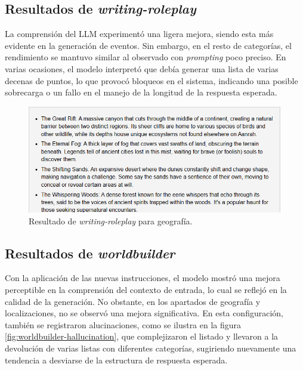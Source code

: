 \subsection{Resultados de \textit{writing-roleplay}}
La comprensión del LLM experimentó una ligera mejora,
siendo esta más evidente en la generación de eventos.
Sin embargo, en el resto de categorías, el rendimiento se mantuvo similar al observado con \textit{prompting} poco preciso.
En varias ocasiones, el modelo interpretó que debía generar una lista de varias decenas de puntos,
lo que provocó bloqueos en el sistema, indicando una posible sobrecarga o un fallo en el manejo de la longitud de la respuesta esperada.

\begin{figure}[htbp]
	\centering
	\includegraphics[width=1\textwidth]{./Figures/writing-prompt-geography.png}
	\caption{Resultado de \textit{writing-roleplay} para geografía.}
	\label{fig:writing-geography}
\end{figure}

\subsection{Resultados de \textit{worldbuilder}}
Con la aplicación de las nuevas instrucciones, el modelo mostró
una mejora perceptible en la comprensión del contexto de entrada,
lo cual se reflejó en la calidad de la generación.
No obstante, en los apartados de geografía y localizaciones, no se observó una mejora significativa.
En esta configuración, también se registraron alucinaciones, como se ilustra en la figura \ref{fig:worldbuilder-hallucination},
que complejizaron el listado y llevaron a la devolución de varias listas con diferentes categorías,
sugiriendo nuevamente una tendencia a desviarse de la estructura de respuesta esperada.

